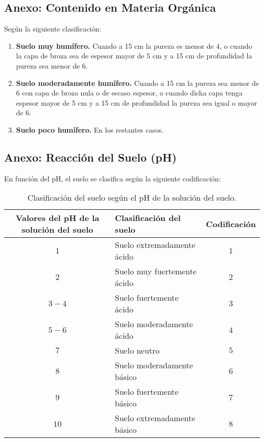 \subsection{Anexo: Contenido en Materia Orgánica}\label{sec:MatOrg}


Según la siguiente clasificación:

\begin{enumerate}
    \item \textbf{Suelo muy humífero.} Cuando a 15 cm la pureza es menor de 4, o cuando la capa de broza sea de espesor mayor de 5 cm y a 15 cm de profundidad la pureza sea menor de 6.
    \item \textbf{Suelo moderadamente humífero.} Cuando a 15 cm la pureza sea menor de 6 con capa de broza nula o de escaso espesor, o cuando dicha capa tenga espesor mayor de 5 cm y a 15 cm de profundidad la pureza sea igual o mayor de 6.
    \item \textbf{Suelo poco humífero.} En los restantes casos.
\end{enumerate}



\subsection{Anexo: Reacción del Suelo (pH)}\label{sec:ph}

En función del pH, el suelo se clasifica según la siguiente codificación:

\begin{table}[H]
\centering
\renewcommand{\arraystretch}{1.4}
\begin{tabular}{|c|l|c|}
\hline
\textbf{Valores del pH de la solución del suelo} & \textbf{Clasificación del suelo} & \textbf{Codificación} \\
\hline
$1$     & Suelo extremadamente ácido       & $1$ \\
$2$     & Suelo muy fuertemente ácido      & $2$ \\
$3-4$   & Suelo fuertemente ácido          & $3$ \\
$5-6$   & Suelo moderadamente ácido        & $4$ \\
$7 $    & Suelo neutro                     & $5$ \\
$8 $    & Suelo moderadamente básico       & $6$ \\
$9 $    & Suelo fuertemente básico         & $7$ \\
$10 $   & Suelo extremadamente básico      & $8$ \\
\hline
\end{tabular}
\caption{Clasificación del suelo según el pH de la solución del suelo.}
\label{anexo:ph}
\end{table}



